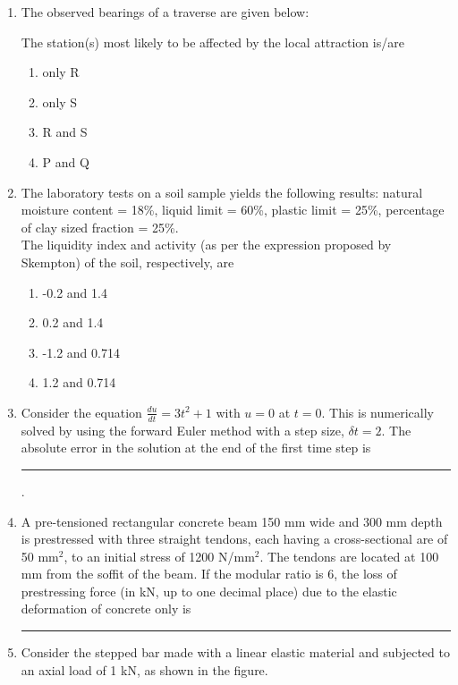 \documentclass[journal]{IEEEtran}
\begin{document}
\begin{enumerate}
\item The observed bearings of a traverse are given below:

The station(s) most likely to be affected by the local attraction is/are
\begin{multicols}{2}
    \begin{enumerate}
        \item only R
        \item only S
        \item R and S
        \item P and Q
    \end{enumerate}
\end{multicols}

\item The laboratory tests on a soil sample yields the following results: natural moisture content = 18\%, liquid limit = 60\%, plastic limit = 25\%, percentage of clay sized fraction = 25\%.\\
The liquidity index and activity (as per the expression proposed by Skempton) of the soil, respectively, are
\begin{multicols}{2}
    \begin{enumerate}
        \item -0.2 and 1.4
        \item 0.2 and 1.4
        \item -1.2 and 0.714
        \item 1.2 and 0.714
    \end{enumerate}
\end{multicols}

\item Consider the equation $\frac{du}{dt} = 3t^2 + 1$ with $u=0$ at $t=0$. This is numerically solved by using the forward Euler method with a step size, $\delta t = 2$. The absolute error in the solution at the end of the first time step is \rule{1cm}{0.15mm} .

\item A pre-tensioned rectangular concrete beam 150 mm wide and 300 mm depth is prestressed with three straight tendons, each having a cross-sectional are of 50 mm${^2}$, to an initial stress of 1200 N/mm${^2}$. The tendons are located at 100 mm from the soffit of the beam. If the modular ratio is 6, the loss of prestressing force (in kN, up to one decimal place) due to the elastic deformation of concrete only is \rule{1cm}{0.15mm}

\item Consider the stepped bar made with a linear elastic material and subjected to an axial load of 1 kN, as shown in the figure.
\end{enumerate}
\end{document}
